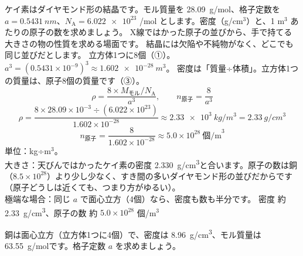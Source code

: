 \label{ph:原-8:ex3}
\begin{phreidai}
ケイ素はダイヤモンド形の結晶です。モル質量を \qty{28.09}{g/mol}、格子定数を $a=\qty{0.5431}{nm}$、$N_{\mathrm A}=\num{6.022e23}$ /mol とします。密度（g/cm$^3$）と、1 m$^3$ あたりの原子の数を求めましょう。
\phbamen
X線ではかった原子の並びから、手で持てる大きさの物の性質を求める場面です。
\phmushi
結晶には欠陥や不純物がなく、どこでも同じ並びだとします。
\phzu
立方体1つに8個（①）。$a^3=(0.5431\times10^{-9})^3\approx\qty{1.602e-28}{m^3}$。
\phriyu
密度は「質量÷体積」。立方体1つの質量は、原子8個の質量です（③）。
\phtateru
\[ \rho=\frac{8\times M_{\text{モル}}/N_{\mathrm A}}{a^3},\qquad n_{\text{原子}}=\frac{8}{a^3} \]
\phtoku
\[ \rho=\frac{8\times28.09\times10^{-3}\div(6.022\times10^{23})}{1.602\times10^{-28}}\approx\qty{2.33e3}{kg/m^3}=\qty{2.33}{g/cm^3} \]
\[ n_{\text{原子}}=\frac{8}{1.602\times10^{-28}}\approx5.0\times10^{28}\ \text{個/m}^3 \]
\phtashikame
単位：kg÷m$^3$。\\
大きさ：天びんではかったケイ素の密度 \qty{2.330}{g/cm^3}と合います。原子の数は銅（$8.5\times10^{28}$）より少し少なく、すき間の多いダイヤモンド形の並びだからです（原子どうしは近くても、つまり方がゆるい）。\\
極端な場合：同じ $a$ で面心立方（4個）なら、密度も数も半分です。
\kotae 密度 約 \qty{2.33}{g/cm^3}、原子の数 約 $5.0\times10^{28}$ 個/m$^3$
\end{phreidai}
\begin{jibun}
銅は面心立方（立方体1つに4個）で、密度は \qty{8.96}{g/cm^3}、モル質量は \qty{63.55}{g/mol}です。格子定数 $a$ を求めましょう。
\end{jibun}

